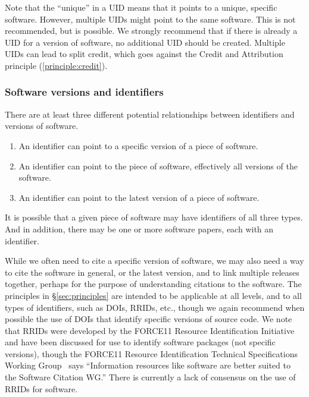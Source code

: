\documentclass[11pt, oneside]{amsart}
\newcommand{\katznote}[1]{ {\textcolor{blue} { ***DSK: #1 }}} %
\newcommand{\LJHnote}[1]{ {\textcolor{fuschsia} { ***LJH: #1 }}} %
\begin{document}
Note that the ``unique'' in a UID means that it points to a unique, specific software. However, multiple UIDs might point to the same software.
This is not recommended, but is possible.
We strongly recommend that if there is already a UID for a version of software, no additional UID should be created.
Multiple UIDs can lead to split credit, which goes against the Credit and Attribution principle (\ref{principle:credit}).


\subsubsection*{Software versions and identifiers}

There are at least three different potential relationships between identifiers and versions of software.
\begin{enumerate}
\item An identifier can point to a specific version of a piece of software.
\item An identifier can point to the piece of software, effectively all versions of the software.
\item An identifier can point to the latest version of a piece of software.
\end{enumerate}
It is possible that a given piece of software may have identifiers of all three types.  And in addition,
there may be one or more software papers, each with an identifier.

While we often need to cite a specific version of software, we may also need a way to cite the
software in general, or the latest version, and to link multiple releases together, perhaps for
the purpose of understanding citations to the software.  The principles in \S\ref{sec:principles} are
intended to be applicable at all levels, and to all types of identifiers, such as DOIs, RRIDs, etc.,
though we again recommend when possible the use of DOIs that identify specific versions of
source code.  We note that RRIDs were developed by the FORCE11 Resource Identification Initiative~\cite{f11rii}
and have been discussed for use to identify software packages (not specific versions),
though the FORCE11 Resource Identification Technical Specifications Working
Group~\cite{f11rrridtswg} says ``Information resources like software are better suited to
the Software Citation WG.''
There is currently a lack of consensus on the use of RRIDs for software.
\end{document}
